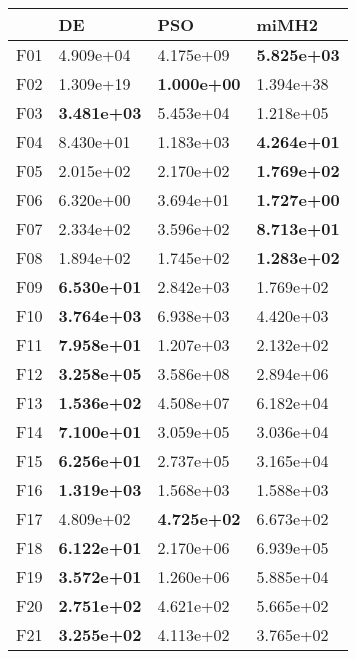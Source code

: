 \documentclass[10pt,a4paper]{article}
\begin{document}
\begin{table}[]
	\centering
	\begin{tabular}{|l|l|l|l|}
		\hline
		& DE                 & PSO                & miMH2              \\ \hline
		F01  & 4.909e+04          & 4.175e+09          & \textbf{5.825e+03} \\
		F02  & 1.309e+19          & \textbf{1.000e+00} & 1.394e+38          \\
		F03  & \textbf{3.481e+03} & 5.453e+04          & 1.218e+05          \\
		F04  & 8.430e+01          & 1.183e+03          & \textbf{4.264e+01} \\
		F05  & 2.015e+02          & 2.170e+02          & \textbf{1.769e+02} \\
		F06  & 6.320e+00          & 3.694e+01          & \textbf{1.727e+00} \\
		F07  & 2.334e+02          & 3.596e+02          & \textbf{8.713e+01} \\
		F08  & 1.894e+02          & 1.745e+02          & \textbf{1.283e+02} \\
		F09  & \textbf{6.530e+01} & 2.842e+03          & 1.769e+02          \\
		F10  & \textbf{3.764e+03} & 6.938e+03          & 4.420e+03          \\
		F11  & \textbf{7.958e+01} & 1.207e+03          & 2.132e+02          \\
		F12  & \textbf{3.258e+05} & 3.586e+08          & 2.894e+06          \\
		F13  & \textbf{1.536e+02} & 4.508e+07          & 6.182e+04          \\
		F14  & \textbf{7.100e+01} & 3.059e+05          & 3.036e+04          \\
		F15  & \textbf{6.256e+01} & 2.737e+05          & 3.165e+04          \\
		F16  & \textbf{1.319e+03} & 1.568e+03          & 1.588e+03          \\
		F17  & 4.809e+02          & \textbf{4.725e+02} & 6.673e+02          \\
		F18  & \textbf{6.122e+01} & 2.170e+06          & 6.939e+05          \\
		F19  & \textbf{3.572e+01} & 1.260e+06          & 5.885e+04          \\
		F20  & \textbf{2.751e+02} & 4.621e+02          & 5.665e+02          \\
		F21  & \textbf{3.255e+02} & 4.113e+02          & 3.765e+02          \\

\end{tabular}
\end{table}
\end{document}
